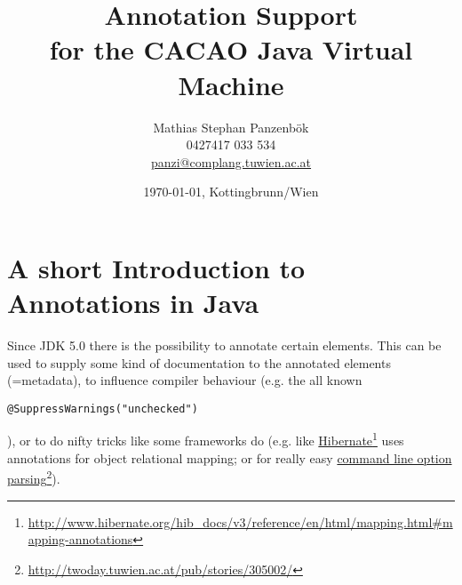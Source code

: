 \documentclass[a4paper, 10pt, titlepage]{scrartcl} %
\begin{document}


\title{Annotation Support\\
for the CACAO Java Virtual Machine}

\author{Mathias Stephan Panzenbök\\
0427417 033 534\\
\href{mailto:panzi@complang.tuwien.ac.at}{panzi@complang.tuwien.ac.at}}
\date{\today{}, Kottingbrunn/Wien}

\maketitle
\tableofcontents
\pagebreak


\section{A short Introduction to Annotations in Java}
\label{sec:annotations-java-intro}
Since JDK 5.0 there is the possibility to annotate certain elements. This can
be used to supply some kind of documentation to the annotated elements
(=metadata), to influence compiler behaviour (e.g. the all known
\begin{scriptsize}\verb||\hspace{0.0pt}\verb|@|\hspace{0.0pt}\verb|SuppressWarnings|\hspace{0.0pt}\verb|(|\hspace{0.0pt}\verb||\hspace{0.0pt}\verb|"|\hspace{0.0pt}\verb|unchecked|\hspace{0.0pt}\verb|"|\hspace{0.0pt}\verb||\hspace{0.0pt}\verb|)|\hspace{0.0pt}\verb||\end{scriptsize}), or to do nifty tricks like some frameworks do (e.g. like
\href{http://www.hibernate.org/hib_docs/v3/reference/en/html/mapping.html#mapping-annotations}{Hibernate}\footnote{\url{http://www.hibernate.org/hib\_docs/v3/reference/en/html/mapping.html\#mapping-annotations}}
uses annotations for object relational mapping; or for really easy
\href{http://twoday.tuwien.ac.at/pub/stories/305002/}{command line option parsing}\footnote{\url{http://twoday.tuwien.ac.at/pub/stories/305002/}}).
\end{document}
